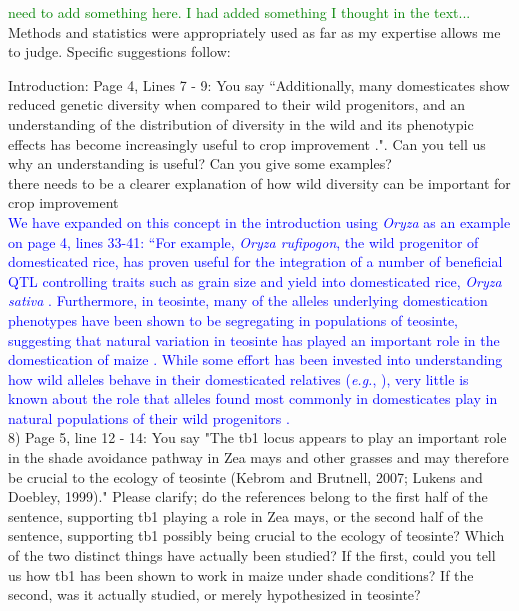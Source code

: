 \documentclass[11pt]{article}
\newcommand{\res}[1]{\noindent \textcolor{blue}{{#1}} \\}
\newcommand{\lev}[1]{\noindent \textcolor{green}{{#1}} \\}
\newcommand{\mbh}[1]{\noindent \textcolor{Dandelion}{{#1}}\\}
\begin{document}
\lev{need to add something here. I had added something I thought in the text...}

Methods and statistics were appropriately used as far as my expertise allows me to judge.
Specific suggestions follow:

Introduction:
Page 4, Lines 7 - 9: You say ``Additionally, many domesticates show reduced genetic diversity when compared to their wild progenitors, and an understanding of the distribution of diversity in the wild and its phenotypic effects has become increasingly useful to crop improvement \citep{KovackMcCouch2008}.".  Can you tell us why an understanding is useful? Can you give some examples?\\

\mbh{there needs to be a clearer explanation of how wild diversity can be important for crop improvement}

\res{We have expanded on this concept in the introduction using \emph{Oryza} as an example on page 4, lines 33-41: ``For example, \emph{Oryza rufipogon}, the wild progenitor of domesticated rice, has proven useful for the integration of a number of beneficial QTL controlling traits such as grain size and yield into domesticated rice, \emph{Oryza sativa} \citep{KovachMcCouch2008}. Furthermore, in teosinte, many of the alleles underlying domestication phenotypes have been shown to be segregating in populations of teosinte, suggesting that natural variation in teosinte has played an important role in the domestication of maize \citep{Gallavotti2004; SigmonVollbrecht2010}. While some effort has been invested into understanding how wild alleles behave in their domesticated relatives (\emph{e.g.}, \citealt{Bai2007}), very little is known about the role that alleles found most commonly in domesticates play in natural populations of their wild progenitors \citep{Whitton1997}.}

8) Page 5, line 12 - 14: You say "The tb1 locus appears to play an important role in the shade avoidance pathway in Zea mays and other grasses and may therefore be crucial to the ecology of teosinte (Kebrom and Brutnell, 2007; Lukens and Doebley, 1999)." Please clarify; do the references belong to the first half of the sentence, supporting tb1 playing a role in Zea mays, or the second half of the sentence, supporting tb1 possibly being crucial to the ecology of teosinte? Which of the two distinct things have actually been studied? If the first, could you tell us how tb1 has been shown to work in maize under shade conditions? If the second, was it actually studied, or merely hypothesized in teosinte?\\ 
\end{document}

